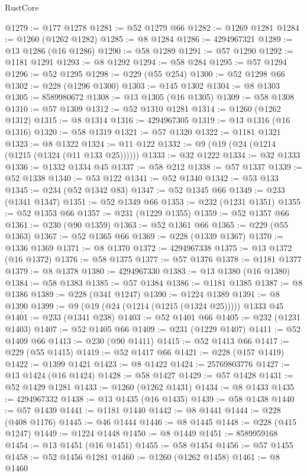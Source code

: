 \begin{lexlean}{RustCore}
\begin{coremodule}
@1279 := @177 @1278
@1281 := @52 @1279 @66
@1282 := @1269 @1281
@1284 := @1260 (@1262 @1282)
@1285 := @8 @1284
@1286 := 4294967321
@1289 := @13 @1286 (@16 @1286)
@1290 := @58 @1289
@1291 := @57 @1290
@1292 := @1181 @1291
@1293 := @8 @1292
@1294 := @58 @284
@1295 := @57 @1294
@1296 := @52 @1295
@1298 := @229 (@55 @254)
@1300 := @52 @1298 @66
@1302 := @228 (@1296 @1300)
@1303 := @145 @1302
@1304 := @8 @1303
@1305 := 8589980672
@1308 := @13 @1305 (@16 @1305)
@1309 := @58 @1308
@1310 := @57 @1309
@1312 := @52 @1310 @1281
@1314 := @1260 (@1262 @1312)
@1315 := @8 @1314
@1316 := 4294967305
@1319 := @13 @1316 (@16 @1316)
@1320 := @58 @1319
@1321 := @57 @1320
@1322 := @1181 @1321
@1323 := @8 @1322
@1324 := @11 @122
@1332 := @9 (@19 (@24 (@1214 (@1215 (@1324 (@11 @133 @25))))))
@1333 := @32 @1222
@1334 := @32 @1333
@1336 := @1332 @1334 @45
@1337 := @58 @212
@1338 := @57 @1337
@1339 := @52 @1338
@1340 := @53 @122
@1341 := @52 @1340
@1342 := @53 @133
@1345 := @234 (@52 @1342 @83)
@1347 := @52 @1345 @66
@1349 := @233 (@1341 @1347)
@1351 := @52 @1349 @66
@1353 := @232 (@1231 @1351)
@1355 := @52 @1353 @66
@1357 := @231 (@1229 @1355)
@1359 := @52 @1357 @66
@1361 := @230 (@90 @1359)
@1363 := @52 @1361 @66
@1365 := @229 (@55 @1363)
@1367 := @52 @1365 @66
@1369 := @228 (@1339 @1367)
@1370 := @1336 @1369
@1371 := @8 @1370
@1372 := 4294967338
@1375 := @13 @1372 (@16 @1372)
@1376 := @58 @1375
@1377 := @57 @1376
@1378 := @1181 @1377
@1379 := @8 @1378
@1380 := 4294967330
@1383 := @13 @1380 (@16 @1380)
@1384 := @58 @1383
@1385 := @57 @1384
@1386 := @1181 @1385
@1387 := @8 @1386
@1389 := @228 (@341 @1247)
@1390 := @1224 @1389
@1391 := @8 @1390
@1399 := @9 (@19 (@24 (@1214 (@1215 (@1324 @25))))) @1333 @45
@1401 := @233 (@1341 @238)
@1403 := @52 @1401 @66
@1405 := @232 (@1231 @1403)
@1407 := @52 @1405 @66
@1409 := @231 (@1229 @1407)
@1411 := @52 @1409 @66
@1413 := @230 (@90 @1411)
@1415 := @52 @1413 @66
@1417 := @229 (@55 @1415)
@1419 := @52 @1417 @66
@1421 := @228 (@157 @1419)
@1422 := @1399 @1421
@1423 := @8 @1422
@1424 := 25769803776
@1427 := @13 @1424 (@16 @1424)
@1428 := @58 @1427
@1429 := @57 @1428
@1431 := @52 @1429 @1281
@1433 := @1260 (@1262 @1431)
@1434 := @8 @1433
@1435 := 4294967332
@1438 := @13 @1435 (@16 @1435)
@1439 := @58 @1438
@1440 := @57 @1439
@1441 := @1181 @1440
@1442 := @8 @1441
@1444 := @228 (@408 @1176)
@1445 := @46 @1444
@1446 := @8 @1445
@1448 := @228 (@415 @1247)
@1449 := @1224 @1448
@1450 := @8 @1449
@1451 := 8589959168
@1454 := @13 @1451 (@16 @1451)
@1455 := @58 @1454
@1456 := @57 @1455
@1458 := @52 @1456 @1281
@1460 := @1260 (@1262 @1458)
@1461 := @8 @1460

\end{coremodule}
\end{lexlean}
